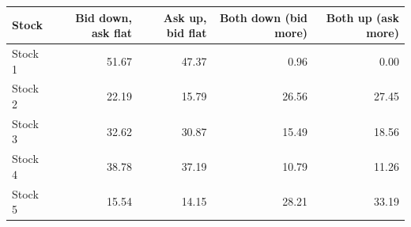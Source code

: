 \begin{tabular}{lrrrr}
\toprule
Stock & Bid down, ask flat & Ask up, bid flat & Both down (bid more) & Both up (ask more) \\
\midrule
Stock 1 & 51.67 & 47.37 & 0.96 & 0.00 \\
Stock 2 & 22.19 & 15.79 & 26.56 & 27.45 \\
Stock 3 & 32.62 & 30.87 & 15.49 & 18.56 \\
Stock 4 & 38.78 & 37.19 & 10.79 & 11.26 \\
Stock 5 & 15.54 & 14.15 & 28.21 & 33.19 \\
\bottomrule
\end{tabular}
